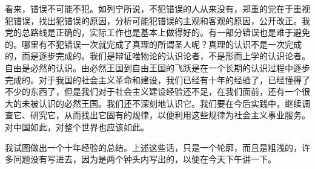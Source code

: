 看来，错误不可能不犯。如列宁所说，不犯错误的人从来没有，郑重的党在于重视犯错误，找出犯错误的原因，分析可能犯错误的主观和客观的原因，公开改正。我党的总路线是正确的，实际工作也是基本上做得好的。有一部分错误也是难于避免的。哪里有不犯错误一次就完成了真理的所谓圣人呢？真理的认识不是一次完成的，而是逐步完成的。我们是辩证唯物论的认识论者，不是形而上学的认识论者。自由是必然的认识。由必然王国到自由王国的飞跃是在一个长期的认识过程中逐步完成的。对于我国的社会主义革命和建设，我们已经有十年的经验了，已经懂得了不少的东西了，但是我们对于社会主义建设经验还不足，在我们面前，还有一个很大的未被认识的必然王国。我们还不深刻地认识它。我们要在今后实践中，继续调查它、研究它，从而找出它固有的规律，以便利用这些规律为社会主义事业服务。对中国如此，对整个世界也应该如此。

我试图做出一个十年经验的总结。上述这些话，只是一个轮廓，而且是粗浅的，许多问题没有写进去，因为是两个钟头内写出的，以便在今天下午讲一下。


